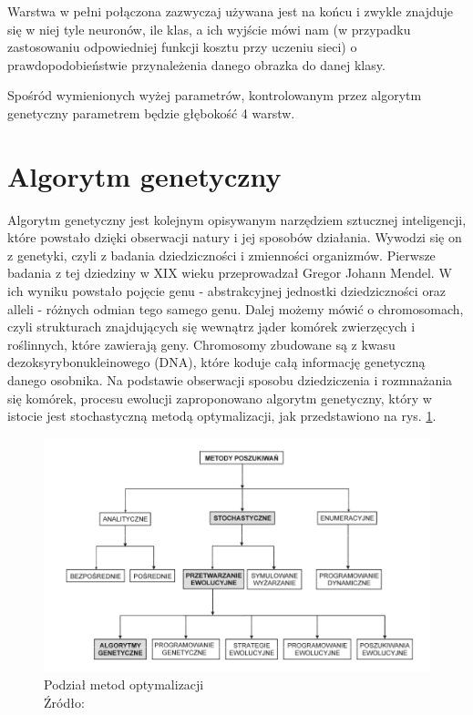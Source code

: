 Warstwa w pełni połączona zazwyczaj używana jest na końcu i zwykle znajduje się w niej tyle neuronów, ile klas, a ich wyjście mówi nam (w przypadku zastosowaniu odpowiedniej funkcji kosztu przy uczeniu sieci) o prawdopodobieństwie przynależenia danego obrazka do danej klasy.

Spośród wymienionych wyżej parametrów, kontrolowanym przez algorytm genetyczny parametrem będzie głębokość 4 warstw.

\section{Algorytm genetyczny}\label{sec:ag}

Algorytm genetyczny jest kolejnym opisywanym narzędziem sztucznej inteligencji, które powstało dzięki obserwacji natury i jej sposobów działania.
Wywodzi się on z genetyki, czyli z badania dziedziczności i zmienności organizmów.
Pierwsze badania z tej dziedziny w XIX wieku przeprowadzał Gregor Johann Mendel.
W ich wyniku powstało pojęcie genu - abstrakcyjnej jednostki dziedziczności oraz alleli - różnych odmian tego samego genu.
Dalej możemy mówić o chromosomach, czyli strukturach znajdujących się wewnątrz jąder komórek zwierzęcych i roślinnych, które zawierają geny.
Chromosomy zbudowane są z kwasu dezoksyrybonukleinowego (DNA), które koduje całą informację genetyczną danego osobnika.
Na podstawie obserwacji sposobu dziedziczenia i rozmnażania się komórek, procesu ewolucji zaproponowano algorytm genetyczny, który w istocie jest stochastyczną metodą optymalizacji, jak przedstawiono na rys. \ref{fig:klas_opt}.

\begin{figure}[h!tb]
	 \centering
	 \includegraphics[width = 0.8\linewidth]{img/optymalizacja}
	 \caption{Podział metod optymalizacji \\
              Źródło: \cite{bialaszewski2012}}
	 \label{fig:klas_opt}
\end{figure}

